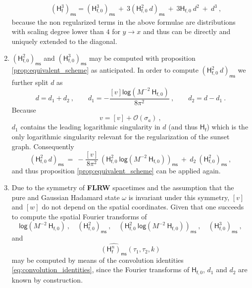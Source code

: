 \documentclass[11pt]{book}
\newcommand{\ms}{\mathsf{ms}}
\renewcommand{\log}{\mathsf{log}}
\newcommand{\Ocal}{\mathcal{O}}
\newcommand{\Hsf}{\mathsf{H}}
\newcommand{\fsf}{\mathsf{f}}
\theoremstyle{break}
\begin{document}
\begin{enumerate}
\begin{eqnarray}
&& (\Hsf_\fsf^3)_\ms = (\Hsf_{\fsf,0}^3)_\ms \ + \ 3 \left(\Hsf_{\fsf,0}^2 \ d \right)_\ms \ + \ 3 \Hsf_{\fsf,0} \ d^2 \ + \ d^3 \ , 
\label{eq:fish_sunset_reg}
\end{eqnarray}
%
because the non regularized terms in the above formulae are distributions with scaling degree lower than $4$ for $y \to x$ and thus can be directly and uniquely extended to the diagonal.
%
%
\item $\left(\Hsf_{\fsf,0}^2\right)_\ms$ and  $\left(\Hsf_{\fsf,0}^3\right)_\ms$ may be computed with proposition \ref{prop:equivalent_scheme} as anticipated. In order to compute $\left(\Hsf_{\fsf,0}^2 \ d\right)_\ms$ we further split $d$ as
%
\begin{equation*}%
d = d_1 + d_2 \ , \qquad d_1 = - \frac{[v] \log\left(M^{-2} \ \Hsf_{\fsf,0}\right)}{8\pi^2} \ ,\qquad d_2 = d - d_1 \ .
\label{eq:d_split}
\end{equation*}
%
Because 
%
\begin{equation*}
v = [v] + \Ocal(\sigma_a) \ , 
\end{equation*}
%
$d_1$ contains the leading logarithmic singularity in $d$ (and thus $\Hsf_\fsf$) which is the only logarithmic singularity relevant for the regularization of the sunset graph. Consequently
%
\begin{equation}
\left(\Hsf_{\fsf,0}^2 \ d\right)_\ms \ = \ - \frac{[v]}{8\pi^2} \ \left(\Hsf_{\fsf,0}^2 \ \log\left(M^{-2} \ \Hsf_{\fsf,0} \right) \right)_\ms \ + \ d_2 \ \left(\Hsf_{\fsf,0}^2 \right)_\ms \ ,
\label{eq:fish_sunset_reg_2}
\end{equation}
%
and thus proposition \ref{prop:equivalent_scheme} can be applied again.
%
%
\item Due to the symmetry of \textbf{FLRW} spacetimes and the assumption that the pure and Gaussian Hadamard state $\omega$ is invariant under this symmetry, $[v]$ and $[w]$ do not depend on the spatial coordinates. Given that one succeeds to compute the spatial Fourier transforms of 
%
\begin{equation*}
\log \left(M^{-2} \ \Hsf_{\fsf,0}\right) \ , \quad
\left(\Hsf_{\fsf,0}^2\right)_\ms \ , \quad
\left(\Hsf_{\fsf,0}^2 \ \log\left(M^{-2} \ \Hsf_{\fsf,0}\right)\right)_\ms \ , \quad  \left(\Hsf_{\fsf,0}^3\right)_\ms \ , 
\end{equation*}
%
and
%
\begin{equation*}
\widehat{(\Hsf_\fsf^n)_\ms}(\tau_1,\tau_2,k)
\end{equation*}
%
may be computed by means of the convolution identities \eqref{eq:convolution_identities}, since the Fourier transforms of $\Hsf_{\fsf,0}$, $d_1$ and $d_2$ are known by construction.
%
%
\end{enumerate}
\end{document}
